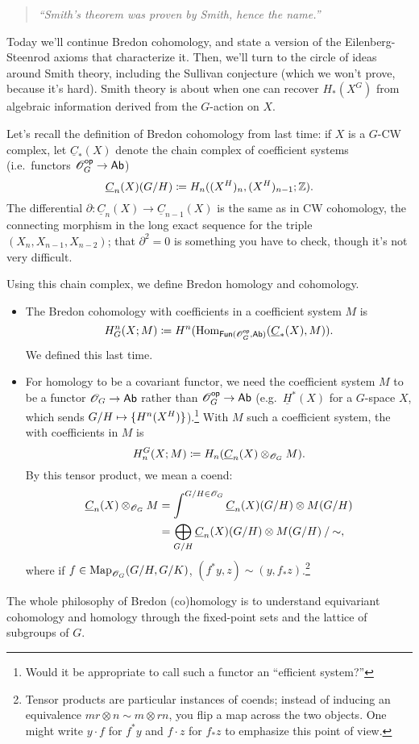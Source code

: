 
\begin{quote}\textit{
	``Smith's theorem was proven by Smith, hence the name.''
}\end{quote}
%
Today we'll continue Bredon cohomology, and state a version of the Eilenberg-Steenrod axioms that characterize it.
Then, we'll turn to the circle of ideas around Smith theory, including the Sullivan conjecture (which we won't
prove, because it's hard). Smith theory is about when one can recover $H_*(X^G)$ from algebraic information derived
from the $G$-action on $X$.

Let's recall the definition of Bredon cohomology from last time: if $X$ is a $G$-CW complex, let $\underline
C_*(X)$ denote the chain complex of coefficient systems (i.e.\ functors $\mathscr O_G^{\mathsf{op}}\to\mathsf{Ab}$)
\[\underline C_n(X)(G/H)\coloneqq H_n((X^H)_n, (X^H)_{n-1}; \mathbb Z).\]
The differential $\partial\colon\underline C_n(X)\to\underline C_{n-1}(X)$ is the same as in CW cohomology, the
connecting morphism in the long exact sequence for the triple $(X_n, X_{n-1}, X_{n-2})$; that $\partial^2 = 0$ is
something you have to check, though it's not very difficult.

Using this chain complex, we define Bredon homology and cohomology.
\begin{itemize}
	\item The Bredon cohomology with coefficients in a coefficient system $M$ is
	\[H_G^n(X;M) \coloneqq H^n(\operatorname{Hom}_{\mathsf{Fun}(\mathscr O_G^{\mathsf{op}}, \mathsf{Ab})}(\underline C_*(X), M)).\]
	We defined this last time.
	\item For homology to be a covariant functor, we need the coefficient system $M$ to be a functor $\mathscr O_G\to\mathsf{Ab}$
	rather than $\mathscr O_G^{\mathsf{op}}\to\mathsf{Ab}$ (e.g.\ $\underline H^*(X)$ for a $G$-space $X$, which sends
	$G/H\mapsto\set{H^n(X^H)}$).\footnote{Would it be appropriate to call such a functor an ``efficient system?''}
	With $M$ such a coefficient system, the  with coefficients in $M$ is
	\[H_n^G(X; M) \coloneqq H_n(\underline C_n(X)\otimes_{\mathscr O_G} M).\]
	By this tensor product, we mean a coend:
	\begin{align*}
	\underline C_n(X)\otimes_{\mathscr O_G} M &= \int^{G/H\in \mathscr O_G} \underline C_n(X)(G/H)\otimes M(G/H)\\
	&= \bigoplus_{G/H} {\underline C_n(X)(G/H)\otimes M(G/H)} \mathbin/ {\mathord\sim},
	\end{align*}
	where if $f\in\operatorname{Map}_{\mathscr O_G}(G/H, G/K)$, $(f^*y, z)\sim (y, f_*z)$.\footnote{Tensor products are particular
	instances of coends; instead of inducing an equivalence $mr\otimes n\sim m\otimes rn$, you flip a map across
	the two objects. One might write $y\cdot f$ for $f^* y$ and $f\cdot z$ for $f_* z$ to emphasize this point of view.}
\end{itemize}
The whole philosophy of Bredon (co)homology is to understand equivariant cohomology and homology through the
fixed-point sets and the lattice of subgroups of $G$.

